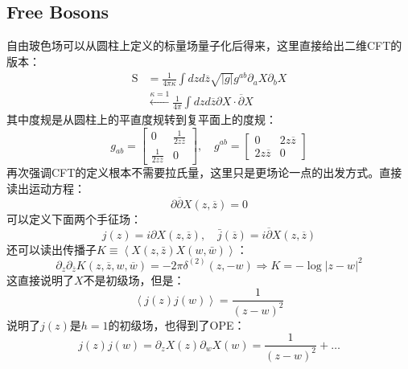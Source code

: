 \subsection{Free Bosons}
自由玻色场可以从圆柱上定义的标量场量子化后得来，这里直接给出二维CFT的版本：
\begin{equation}
	\begin{aligned}
		\text{S}& =\frac1{4\pi\kappa}\int dzd\overline{z}\sqrt{|g|}g^{ab}\partial_aX\partial_bX  \\
		&\xleftarrow{\kappa=1}\frac1{4\pi}\int dzd\overline{z}\partial X\cdot\overline{\partial}X
	\end{aligned}
\end{equation}
其中度规是从圆柱上的平直度规转到复平面上的度规：
\begin{equation}
	\left.g_{ab}=\left[\begin{array}{cc}0&\frac{1}{2z\overline{z}}\\\frac{1}{2z\overline{z}}&0\end{array}\right.\right],\quad g^{ab}=\left[\begin{array}{cc}0&2z\overline{z}\\2z\overline{z}&0\end{array}\right]
\end{equation}
再次强调CFT的定义根本不需要拉氏量，这里只是更场论一点的出发方式。直接读出运动方程：
\begin{equation}
	\partial\overline{\partial}X(z,\overline{z})=0
\end{equation}
可以定义下面两个手征场：
\begin{equation}\label{35.4}
	j(z)=i\partial X(z,\overline z),\quad\bar j(\overline z)=i\overline\partial X(z,\overline z)
\end{equation}
还可以读出传播子$K\equiv\left\langle{X(z,\bar z)X(w,\bar w)}\right\rangle$：
\begin{equation}
	\partial_z\partial_{\overline{z}}K(z,\overline{z},w,\overline{w})=-2\pi\delta^{(2)}(z,-w)\Rightarrow K=-\log\left|z-w\right|^2
\end{equation}
这直接说明了$X$不是初级场，但是：
\begin{equation}
	\left\langle j(z)j(w)\right\rangle=\frac{1}{(z-w)^2}
\end{equation}
说明了$j(z)$是$h=1$的初级场，也得到了OPE：
\begin{equation}\label{35.7}
	\boxed{
		j(z)j(w)=\partial_z X(z)\partial_w X(w)=\frac{1}{(z-w)^2}+\ldots
	}
\end{equation}
